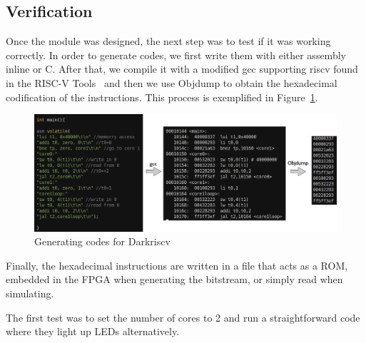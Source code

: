 \subsection{Verification}
Once the module was designed, the next step was to test if it was working correctly.
In order to generate codes, we first write them with either assembly inline or C.
After that, we compile it with a modified gcc supporting riscv found in the RISC-V Tools~\cite{tools} and then we use Objdump to obtain the hexadecimal codification of the instructions.
This process is exemplified in Figure~\ref{coding}.

\begin{figure}[h!]
    \centering
    \includegraphics[width=.9\textwidth]{images/coding.png}
    \caption{Generating codes for Darkriscv}
    \label{coding}
\end{figure}

Finally, the hexadecimal instructions are written in a file that acts as a ROM, embedded in the FPGA when generating the bitstream, or simply read when simulating.

The first test was to set the number of cores to 2 and run a straightforward code where they light up LEDs alternatively.



